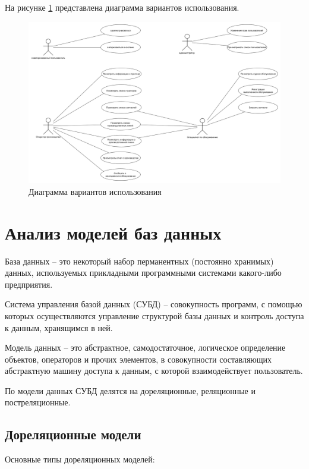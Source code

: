 На рисунке \ref{img:use-case} представлена диаграмма вариантов использования.

\begin{figure}[H]
    \centering
    \includegraphics[width=1\textwidth]{templates/coursework/inc/img/use-case.png}
    \caption{Диаграмма вариантов использования}
    \label{img:use-case}
\end{figure}

\section{Анализ моделей баз данных}

База данных -- это некоторый набор перманентных (постоянно хранимых) данных, используемых прикладными программными системами какого-либо предприятия\cite{дейт2001введение}. 

Система управления базой данных (СУБД) -- совокупность программ, с помощью которых осуществляются управление структурой базы данных и контроль доступа к данным, хранящимся в ней\cite{роб2004системы}.

Модель данных -- это абстрактное, самодостаточное, логическое определение объектов, операторов и прочих элементов, в совокупности составляющих абстрактную машину доступа к данным, с которой взаимодействует пользователь\cite{дейт2001введение}.

По модели данных СУБД делятся на дореляционные, реляционные и постреляционные.

\subsection{Дореляционные модели}

Основные типы дореляционных моделей\cite{дейт2001введение}:

